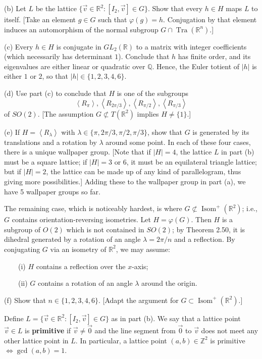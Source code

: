 \documentclass[leqno]{book}
\begin{document}
\begin{enumerate}
(b) Let $L$ be the lattice $\{\vec v\in\mathbb R^2:[I_2,\vec v]\in G\}$.  Show that every $h\in H$ maps $L$ to itself.  [Take an element $g\in G$ such that $\varphi(g)=h$.  Conjugation by that element induces an automorphism of the normal subgroup $G\cap\operatorname{Tra}(\mathbb R^n)$.]

(c) Every $h\in H$ is conjugate in $GL_2(\mathbb R)$ to a matrix with integer coefficients (which necessarily has determinant $1$).  Conclude that $h$ has finite order, and its eigenvalues are either linear or quadratic over $\mathbb Q$.  Hence, the Euler totient of $|h|$ is either $1$ or $2$, so that $|h|\in\{1,2,3,4,6\}$.

(d) Use part (c) to conclude that $H$ is one of the subgroups
$$\left<R_\pi\right>,\left<R_{2\pi/3}\right>,\left<R_{\pi/2}\right>,\left<R_{\pi/3}\right>$$
of $SO(2)$.  [The assumption $G\not\subset T(\mathbb R^2)$ implies $H\ne\{1\}$.]

(e) If $H=\left<R_\lambda\right>$ with $\lambda\in\{\pi,2\pi/3,\pi/2,\pi/3\}$, show that $G$ is generated by its translations and a rotation by $\lambda$ around some point.  In each of these four cases, there is a unique wallpaper group.  [Note that if $|H|=4$, the lattice $L$ in part (b) must be a square lattice; if $|H|=3$ or $6$, it must be an equilateral triangle lattice; but if $|H|=2$, the lattice can be made up of any kind of parallelogram, thus giving more possibilities.]  Adding these to the wallpaper group in part (a), we have 5 wallpaper groups so far.

The remaining case, which is noticeably hardest, is where $G\not\subset\operatorname{Isom}^+(\mathbb R^2)$; i.e., $G$ contains orientation-reversing isometries.  Let $H=\varphi(G)$.  Then $H$ is a subgroup of $O(2)$ which is not contained in $SO(2)$; by Theorem 2.50, it is dihedral generated by a rotation of an angle $\lambda=2\pi/n$ and a reflection.  By conjugating $G$ via an isometry of $\mathbb R^2$, we may assume:

~~~~(i) $H$ contains a reflection over the $x$-axis;

~~~~(ii) $G$ contains a rotation of an angle $\lambda$ around the origin.

(f) Show that $n\in\{1,2,3,4,6\}$.  [Adapt the argument for $G\subset\operatorname{Isom}^+(\mathbb R^2)$.]

Define $L=\{\vec v\in\mathbb R^2:[I_2,\vec v]\in G\}$ as in part (b).  We say that a lattice point $\vec v\in L$ is \textbf{primitive} if $\vec v\ne\vec 0$ and the line segment from $\vec 0$ to $\vec v$ does not meet any other lattice point in $L$.  In particular, a lattice point $(a,b)\in\mathbb Z^2$ is primitive $\iff\gcd(a,b)=1$.


\end{enumerate}
\end{document}
